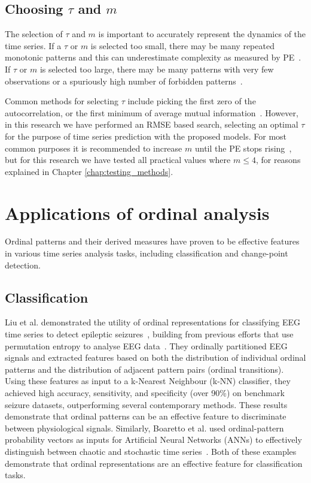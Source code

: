 \subsection{Choosing $\tau$ and $m$}

The selection of $\tau$ and $m$ is important to accurately represent the dynamics of the time series. If a $\tau$ or $m$ is selected too small, there may be many repeated monotonic patterns and this can underestimate complexity as measured by PE~\cite{riedl_2013}. If $\tau$ or $m$ is selected too large, there may be many patterns with very few observations or a spuriously high number of forbidden patterns~\cite{riedl_2013}.

Common methods for selecting $\tau$ include picking the first zero of the autocorrelation, or the first minimum of average mutual information~\cite{riedl_2013}. However, in this research we have performed an RMSE based search, selecting an optimal $\tau$ for the purpose of time series prediction with the proposed models.
For most common purposes it is recommended to increase $m$ until the PE stops rising~\cite{riedl_2013}, but for this research we have tested all practical values where $m\leq4$, for reasons explained in Chapter \ref{chap:testing_methods}.



\section{Applications of ordinal analysis}

Ordinal patterns and their derived measures have proven to be effective features in various time series analysis tasks, including classification and change-point detection.

\subsection{Classification}
Liu et al. demonstrated the utility of ordinal representations for classifying EEG time series to detect epileptic seizures~\cite{liu_2020}, building from previous efforts that use permutation entropy to analyse EEG data~\cite{keller_2007}. They ordinally partitioned EEG signals and extracted features based on both the distribution of individual ordinal patterns and the distribution of adjacent pattern pairs (ordinal transitions). Using these features as input to a k-Nearest Neighbour (k-NN) classifier, they achieved high accuracy, sensitivity, and specificity (over 90\%) on benchmark seizure datasets, outperforming several contemporary methods.
These results demonstrate that ordinal patterns can be an effective feature to discriminate between physiological signals.
Similarly, Boaretto et al. used ordinal-pattern probability vectors as inputs for Artificial Neural Networks (ANNs) to effectively distinguish between chaotic and stochastic time series~\cite{boaretto_2021}. Both of these examples demonstrate that ordinal representations are an effective feature for classification tasks.


